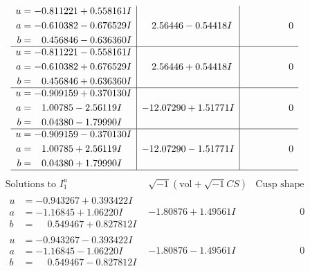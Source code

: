\documentclass[1p]{elsarticle_modified}
\theoremstyle{definition}
\newcommand{\I}{\sqrt{-1}}
\begin{document}
$$\begin{array}{c|c|c}
\begin{aligned}
u &= -0.811221 + 0.558161 I \\
a &= -0.610382 - 0.676529 I \\
b &= \phantom{-}0.456846 - 0.636360 I\end{aligned}
 & \phantom{-}2.56446 - 0.54418 I & \phantom{-0.000000 } 0 \\ \hline\begin{aligned}
u &= -0.811221 - 0.558161 I \\
a &= -0.610382 + 0.676529 I \\
b &= \phantom{-}0.456846 + 0.636360 I\end{aligned}
 & \phantom{-}2.56446 + 0.54418 I & \phantom{-0.000000 } 0 \\ \hline\begin{aligned}
u &= -0.909159 + 0.370130 I \\
a &= \phantom{-}1.00785 - 2.56119 I \\
b &= \phantom{-}0.04380 - 1.79990 I\end{aligned}
 & -12.07290 + 1.51771 I & \phantom{-0.000000 } 0 \\ \hline\begin{aligned}
u &= -0.909159 - 0.370130 I \\
a &= \phantom{-}1.00785 + 2.56119 I \\
b &= \phantom{-}0.04380 + 1.79990 I\end{aligned}
 & -12.07290 - 1.51771 I & \phantom{-0.000000 } 0\\
 \hline 
 \end{array}$$\newpage$$\begin{array}{c|c|c}  
\text{Solutions to }I^u_{1}& \I (\text{vol} + \sqrt{-1}CS) & \text{Cusp shape}\\
 \hline 
\begin{aligned}
u &= -0.943267 + 0.393422 I \\
a &= -1.16845 + 1.06220 I \\
b &= \phantom{-}0.549467 + 0.827812 I\end{aligned}
 & -1.80876 + 1.49561 I & \phantom{-0.000000 } 0 \\ \hline\begin{aligned}
u &= -0.943267 - 0.393422 I \\
a &= -1.16845 - 1.06220 I \\
b &= \phantom{-}0.549467 - 0.827812 I\end{aligned}
 & -1.80876 - 1.49561 I & \phantom{-0.000000 } 0 \\ \hline\begin{aligned}

\end{aligned}
\end{array}$$
\end{document}
